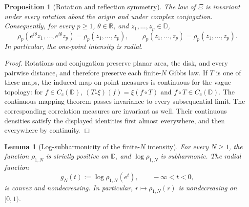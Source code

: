 \documentclass[11pt,a4paper]{article}
\numberwithin{equation}{section}
\newtheorem{proposition}[theorem]{Proposition}
\newtheorem{lemma}[theorem]{Lemma}
\theoremstyle{definition}
\theoremstyle{remark}
\newcommand{\D}{\mathbb D}
\newcommand{\R}{\mathbb R}
\begin{document}
\begin{proposition}[Rotation and reflection symmetry]
\label{prop:orthogonal-symmetry}
The law of $\Xi$ is invariant under every rotation about the origin and
under complex conjugation. Consequently, for every $p\geq1$,
$\theta\in\R$, and $z_1,\ldots,z_p\in\D$,
\[
 \rho_p(e^{i\theta}z_1,\ldots,e^{i\theta}z_p)
 =\rho_p(z_1,\ldots,z_p),
 \qquad
 \rho_p(\overline z_1,\ldots,\overline z_p)
 =\rho_p(z_1,\ldots,z_p).
\]
In particular, the one-point intensity is radial.
\end{proposition}

\begin{proof}
Rotations and conjugation preserve planar area, the disk, and every
pairwise distance, and therefore preserve each finite-$N$ Gibbs law.
If $T$ is one of these maps, the induced map on point measures is
continuous for the vague topology: for $f\in C_c(\D)$,
$(T_*\xi)(f)=\xi(f\circ T)$ and $f\circ T\in C_c(\D)$.
The continuous mapping theorem passes invariance to every subsequential
limit. The corresponding correlation measures are invariant as well.
Their continuous densities satisfy the displayed identities first
almost everywhere, and then everywhere by continuity.
\end{proof}

\begin{lemma}[Log-subharmonicity of the finite-$N$ intensity]
\label{lem:log-subharmonic-intensity}
For every $N\geq1$, the function $\rho_{1,N}$ is strictly positive on
$\D$, and $\log\rho_{1,N}$ is subharmonic. The radial function
\[
 g_N(t):=\log\rho_{1,N}(e^t),\qquad -\infty<t<0,
\]
is convex and nondecreasing. In particular, $r\mapsto\rho_{1,N}(r)$ is
nondecreasing on $[0,1)$.
\end{lemma}
\end{document}
